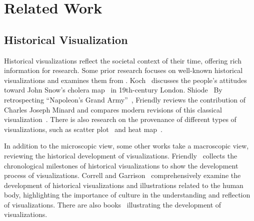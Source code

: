 \section{Related Work}
\label{sec:related-work}


\subsection{Historical Visualization}

Historical visualizations reflect the societal context of their time, offering rich information for research.
Some prior research focuses on well-known historical visualizations and examines them from .
Koch~\cite{Koch2009Crediting} discusses the people's attitudes toward John Snow's cholera map~\cite{Snow1855Mode} in 19th-century London.
Shiode~\cite{Shiode2015mortality} 
By retrospecting ``Napoleon's Grand Army''~\cite{Minard1869Carte}, Friendly reviews the contribution of Charles Joseph Minard and compares modern revisions of this classical visualization~\cite{Friendly2002Visions}.
There is also research on the provenance of different types of visualizations, such as scatter plot~\cite{Friendly2005Early} and heat map~\cite{Wilkinson2009History}. 

In addition to the microscopic view, some other works take a macroscopic view, reviewing the historical development of visualizations.
Friendly~\cite{Friendly2001Milestones} collects the chronological milestones of historical visualizations to show the development process of visualizations.
Correll and Garrison~\cite{Correll2024When} comprehensively examine the development of historical visualizations and illustrations related to the human body, highlighting the importance of culture in the understanding and reflection of visualizations.
There are also books~\cite{Friendly2008Brief, Friendly2021History, Rendgen2019History} illustrating the development of visualizations.


